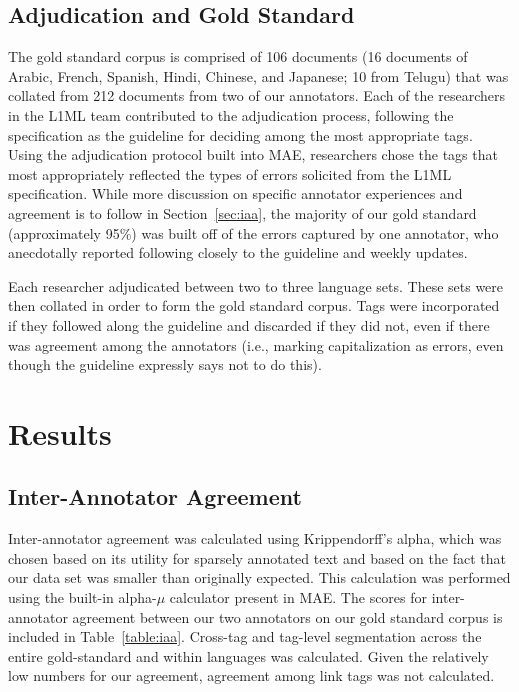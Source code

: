 \documentclass[10pt, a4paper]{article}
\begin{document}
\subsection{Adjudication and Gold Standard}
The gold standard corpus is comprised of 106 documents (16 documents of Arabic, French, Spanish, Hindi, Chinese, and Japanese; 10 from Telugu) that was collated from 212 documents from two of our annotators. Each of the researchers in the L1ML team contributed to the adjudication process, following the specification as the guideline for deciding among the most appropriate tags. Using the adjudication protocol built into MAE, researchers chose the tags that most appropriately reflected the types of errors solicited from the L1ML specification. While more discussion on specific annotator experiences and agreement is to follow in Section~\ref{sec:iaa}, the majority of our gold standard (approximately 95\%) was built off of the errors captured by one annotator, who anecdotally reported following closely to the guideline and weekly updates. 

Each researcher adjudicated between two to three language sets. These sets were then collated in order to form the gold standard corpus. Tags were incorporated if they followed along the guideline and discarded if they did not, even if there was agreement among the annotators (i.e., marking capitalization as errors, even though the guideline expressly says not to do this). 

\section{Results}

\subsection{Inter-Annotator Agreement\label{sec:iaa}}

Inter-annotator agreement was calculated using Krippendorff's alpha, which was chosen based on its utility for sparsely annotated text and based on the fact that our data set was smaller than originally expected. This calculation was performed using the built-in alpha-$\mu$ calculator present in MAE. The scores for inter-annotator agreement between our two annotators on our gold standard corpus is included in Table~\ref{table:iaa}. Cross-tag and tag-level segmentation across the entire gold-standard and within languages was calculated. Given the relatively low numbers for our agreement, agreement among link tags was not calculated.  
\end{document}
